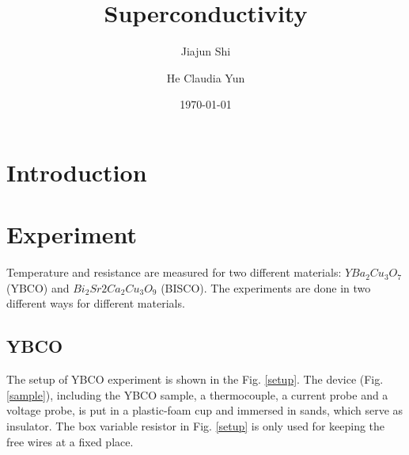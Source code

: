 \documentclass[prb,preprint]{revtex4-1}
\begin{document}
\title{Superconductivity}

\author{Jiajun Shi}
\author{He Claudia Yun}


\date{\today}


\begin{abstract}

\end{abstract}

\maketitle 

\section{Introduction}

\section{Experiment}
Temperature and resistance are measured for two different materials: $YBa_{2}Cu_{3}O_{7}$ (YBCO) and $Bi_{2}Sr{2}Ca_{2}Cu_{3}O_{9}$ (BISCO). The experiments are done in two different ways for different materials.\\
\subsection{YBCO}
The setup of YBCO experiment is shown in the Fig. \ref{setup}. The device (Fig. \ref{sample}), including the YBCO sample, a thermocouple, a current probe and a voltage probe, is put in a plastic-foam cup and immersed in sands, which serve as insulator. The box variable resistor in Fig. \ref{setup} is only used for keeping the free wires at a fixed place. \\
\end{document}
